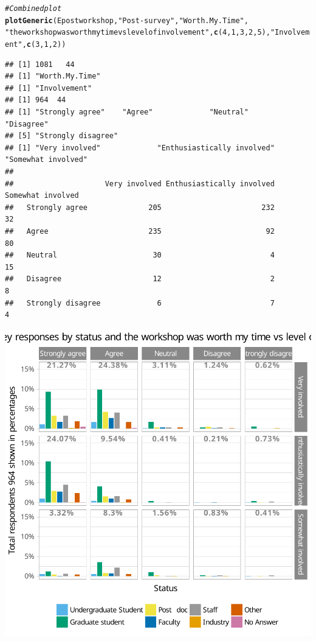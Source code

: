 \documentclass{article}\usepackage[]{graphicx}\usepackage[]{color}
\makeatletter
\newcommand{\hlnum}[1]{\textcolor[rgb]{0.686,0.059,0.569}{#1}}%
\newcommand{\hlstr}[1]{\textcolor[rgb]{0.192,0.494,0.8}{#1}}%
\newcommand{\hlcom}[1]{\textcolor[rgb]{0.678,0.584,0.686}{\textit{#1}}}%
\newcommand{\hlstd}[1]{\textcolor[rgb]{0.345,0.345,0.345}{#1}}%
\newcommand{\hlkwd}[1]{\textcolor[rgb]{0.737,0.353,0.396}{\textbf{#1}}}%
\newenvironment{kframe}{%
 \def\at@end@of@kframe{}%
 \ifinner\ifhmode%
  \def\at@end@of@kframe{\end{minipage}}%
  \begin{minipage}{\columnwidth}%
 \fi\fi%
 \def\FrameCommand##1{\hskip\@totalleftmargin \hskip-\fboxsep
 \colorbox{shadecolor}{##1}\hskip-\fboxsep
     \hskip-\linewidth \hskip-\@totalleftmargin \hskip\columnwidth}%
 \MakeFramed {\advance\hsize-\width
   \@totalleftmargin\z@ \linewidth\hsize
   \@setminipage}}%
 {\par\unskip\endMakeFramed%
 \at@end@of@kframe}
\newenvironment{knitrout}{}{} %
\makeatother
\begin{document}
\begin{knitrout}
\begin{kframe}\begin{alltt}
\hlcom{# Combined plot}
\hlkwd{plotGeneric}\hlstd{(Epostworkshop,} \hlstr{"Post-survey"}\hlstd{,} \hlstr{"Worth.My.Time"} \hlstd{,}
            \hlstr{"the workshop was worth my time vs level of involvement"}\hlstd{,}  \hlkwd{c}\hlstd{(}\hlnum{4}\hlstd{,}\hlnum{1}\hlstd{,}\hlnum{3}\hlstd{,}\hlnum{2}\hlstd{,}\hlnum{5}\hlstd{),}\hlstr{"Involvement"}\hlstd{,} \hlkwd{c}\hlstd{(}\hlnum{3}\hlstd{,}\hlnum{1}\hlstd{,}\hlnum{2}\hlstd{))}
\end{alltt}
\begin{verbatim}
## [1] 1081   44
## [1] "Worth.My.Time"
## [1] "Involvement"
## [1] 964  44
## [1] "Strongly agree"    "Agree"             "Neutral"           "Disagree"         
## [5] "Strongly disagree"
## [1] "Very involved"             "Enthusiastically involved" "Somewhat involved"        
##                    
##                     Very involved Enthusiastically involved Somewhat involved
##   Strongly agree              205                       232                32
##   Agree                       235                        92                80
##   Neutral                      30                         4                15
##   Disagree                     12                         2                 8
##   Strongly disagree             6                         7                 4
\end{verbatim}
\end{kframe}

{\centering \includegraphics[width=.6\linewidth]{figure/calls-Rnwplotting-postsurvey-data-21} 

}



\end{knitrout}
\end{document}
